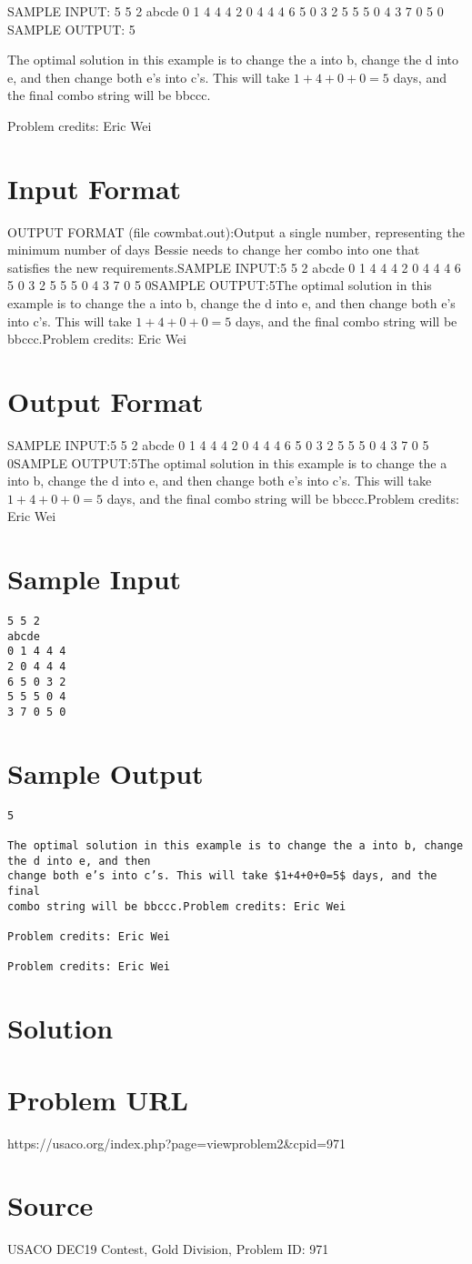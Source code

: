 \documentclass[12pt]{article}
\begin{document}
SAMPLE INPUT:
5 5 2
abcde
0 1 4 4 4
2 0 4 4 4
6 5 0 3 2
5 5 5 0 4
3 7 0 5 0
SAMPLE OUTPUT: 
5


The optimal solution in this example is to change the a into b, change the d into e, and then
change both e’s into c’s. This will take $1+4+0+0=5$ days, and the final
combo string will be bbccc.


Problem credits: Eric Wei



\section*{Input Format}
OUTPUT FORMAT (file cowmbat.out):Output a single number, representing the minimum number of days Bessie needs to
change her combo into one that satisfies the new requirements.SAMPLE INPUT:5 5 2
abcde
0 1 4 4 4
2 0 4 4 4
6 5 0 3 2
5 5 5 0 4
3 7 0 5 0SAMPLE OUTPUT:5The optimal solution in this example is to change the a into b, change the d into e, and then
change both e’s into c’s. This will take $1+4+0+0=5$ days, and the final
combo string will be bbccc.Problem credits: Eric Wei

\section*{Output Format}
SAMPLE INPUT:5 5 2
abcde
0 1 4 4 4
2 0 4 4 4
6 5 0 3 2
5 5 5 0 4
3 7 0 5 0SAMPLE OUTPUT:5The optimal solution in this example is to change the a into b, change the d into e, and then
change both e’s into c’s. This will take $1+4+0+0=5$ days, and the final
combo string will be bbccc.Problem credits: Eric Wei

\section*{Sample Input}
\begin{verbatim}
5 5 2
abcde
0 1 4 4 4
2 0 4 4 4
6 5 0 3 2
5 5 5 0 4
3 7 0 5 0
\end{verbatim}

\section*{Sample Output}
\begin{verbatim}
5

The optimal solution in this example is to change the a into b, change the d into e, and then
change both e’s into c’s. This will take $1+4+0+0=5$ days, and the final
combo string will be bbccc.Problem credits: Eric Wei

Problem credits: Eric Wei

Problem credits: Eric Wei
\end{verbatim}

\section*{Solution}


\section*{Problem URL}
https://usaco.org/index.php?page=viewproblem2&cpid=971

\section*{Source}
USACO DEC19 Contest, Gold Division, Problem ID: 971
\end{document}
